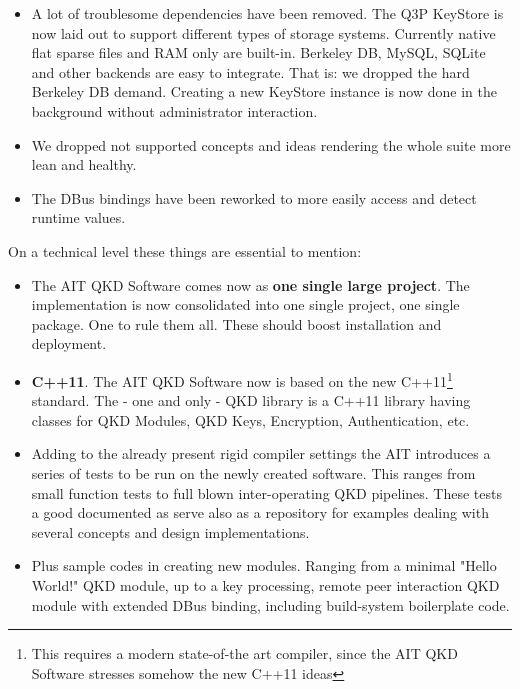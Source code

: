 \begin{itemize}
    \item A lot of troublesome dependencies have been removed. The Q3P KeyStore is now laid out to support different types of storage systems. Currently native flat sparse files and RAM only are built-in. Berkeley DB, MySQL, SQLite and other backends are easy to integrate. That is: we dropped the hard Berkeley DB demand. Creating a new KeyStore instance is now done in the background without administrator interaction.

    \item We dropped not supported concepts and ideas rendering the whole suite more lean and healthy.

    \item The DBus bindings have been reworked to more easily access and detect runtime values.

\end{itemize}

On a technical level these things are essential to mention:

\begin{itemize}

    \item The AIT QKD Software comes now as \textbf{one single large project}. The implementation is now consolidated into one single project, one single package. One to rule them all. These should boost installation and deployment.
    
    \item \textbf{C++11}. The AIT QKD Software now is based on the new C++11\footnote{This requires a modern state-of-the art compiler, since the AIT QKD Software stresses somehow the new C++11 ideas} standard. The - one and only - QKD library is a C++11 library having classes for QKD Modules, QKD Keys, Encryption, Authentication, etc.
    
    \item Adding to the already present rigid compiler settings the AIT introduces a series of tests to be run on the newly created software. This ranges from small function tests to full blown inter-operating QKD pipelines. These tests a good documented as serve also as a repository for examples dealing with several concepts and design implementations.
    
    \item Plus sample codes in creating new modules. Ranging from a minimal "Hello World!" QKD module, up to a key processing, remote peer interaction QKD module with extended DBus binding, including build-system boilerplate code.
    
\end{itemize}

